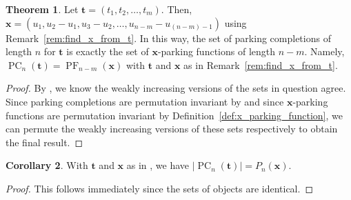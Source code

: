 \documentclass{amsart}
\theoremstyle{definition}
\newtheorem{theorem}{Theorem}[section]
\newtheorem{corollary}[theorem]{Corollary}
\numberwithin{equation}{section}
\newcommand{\PF}{\operatorname{PF}} %
\newcommand{\PC}{\operatorname{PC}} %
\begin{document}
\begin{theorem}\label{thm:MainEnumerativeResult}
    Let $\mathbf{t} = (t_1, t_2, \hdots, t_m)$.
    Then, $\mathbf{x} = (u_1, u_2 - u_1, u_3 - u_2, \hdots, u_{n-m} - u_{(n-m)-1})$ using Remark~\ref{rem:find_x_from_t}.
    In this way, the set of parking completions of length $n$ for $\mathbf{t}$ is exactly the set of $\mathbf{x}$-parking functions of length $n-m$.
    Namely, $\PC_{n}(\mathbf{t}) = \PF_{n-m}(\mathbf{x})$ with $\mathbf{t}$ and $\mathbf{x}$ as in Remark~\ref{rem:find_x_from_t}.
\end{theorem}

\begin{proof}
    By , we know the weakly increasing versions of the sets in question agree.
    Since parking completions are permutation invariant by  and since $\mathbf{x}$-parking functions are permutation invariant by Definition~\ref{def:x_parking_function}, we can permute the weakly increasing versions of these sets respectively to obtain the final result.
\end{proof}



\begin{corollary}
    With $\mathbf{t}$ and $\mathbf{x}$ as in , we have
    $
    |\PC_n(\mathbf{t})| = P_n(\mathbf{x})
    $.
\end{corollary}
\begin{proof}
    This follows immediately since the sets of objects are identical.
\end{proof}
\end{document}
